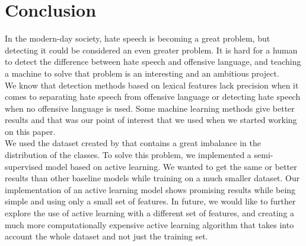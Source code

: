 \documentclass[10pt, a4paper]{article}
\begin{document}
	\section{Conclusion}
	In the modern-day society, hate speech is becoming a great problem, but detecting it could be considered an even greater problem. It is hard for a human to detect the difference between hate speech and offensive language, and teaching a machine to solve that problem is an interesting and an ambitious project.
	\\We know that detection methods based on lexical features lack precision when it comes to separating hate speech from offensive language or detecting hate speech when no offensive language is used. Some machine learning methods give better results and that was our point of interest that we used when we started working on this paper.
	\\We used the dataset created by \citet{Davidson2017AutomatedHS} that contains a great imbalance in the distribution of the classes. To solve this problem, we implemented a semi-supervised model based on active learning. We wanted to get the same or better results than other baseline models while training on a much smaller dataset. Our implementation of an active learning model shows promising results while being simple and using only a small set of features. In future, we would like to further explore the use of active learning with a different set of features, and creating a much more computationally expensive active learning algorithm that takes into account the whole dataset and not just the training set.
	
	
	 
	
\end{document}
